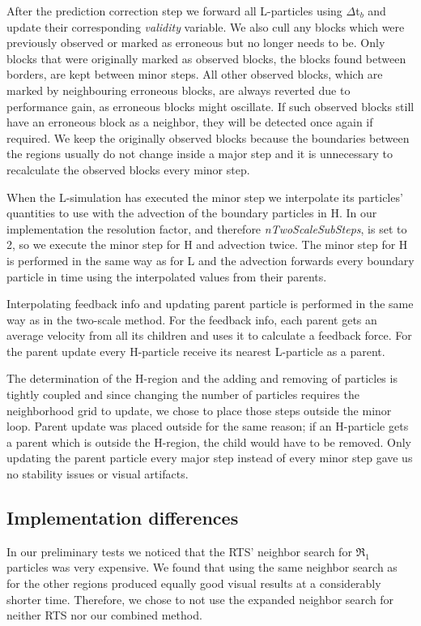 \documentclass[../../main.tex]{subfiles}
\begin{document}
After the prediction correction step we forward all L-particles using $\Delta$t$_b$ and update their corresponding \textit{validity} variable. We also cull any blocks which were previously observed or marked as erroneous but no longer needs to be. Only blocks that were originally marked as observed blocks, the blocks found between borders, are kept between minor steps. All other observed blocks, which are marked by neighbouring erroneous blocks, are always reverted due to performance gain, as erroneous blocks might oscillate. If such observed blocks still have an erroneous block as a neighbor, they will be detected once again if required. We keep the originally observed blocks because the boundaries between the regions usually do not change inside a major step and it is unnecessary to recalculate the observed blocks every minor step. 

When the L-simulation has executed the minor step we interpolate its particles' quantities to use with the advection of the boundary particles in H. In our implementation the resolution factor, and therefore \textit{nTwoScaleSubSteps}, is set to 2, so we execute the minor step for H and advection twice. The minor step for H is performed in the same way as for L and the advection forwards every boundary particle in time using the interpolated values from their parents.

Interpolating feedback info and updating parent particle is performed in the same way as in the two-scale method. For the feedback info, each parent gets an average velocity from all its children and uses it to calculate a feedback force. For the parent update every H-particle receive its nearest L-particle as a parent. 

The determination of the H-region and the adding and removing of particles is tightly coupled and since changing the number of particles requires the neighborhood grid to update, we chose to place those steps outside the minor loop. Parent update was placed outside for the same reason; if an H-particle gets a parent which is outside the H-region, the child would have to be removed. Only updating the parent particle every major step instead of every minor step gave us no stability issues or visual artifacts. 


\subsection{Implementation differences}
In our preliminary tests we noticed that the RTS' neighbor search for $\Re_1$ particles was very expensive. We found that using the same neighbor search as for the other regions produced equally good visual results at a considerably shorter time. Therefore, we chose to not use the expanded neighbor search for neither RTS nor our combined method. 
\end{document}
